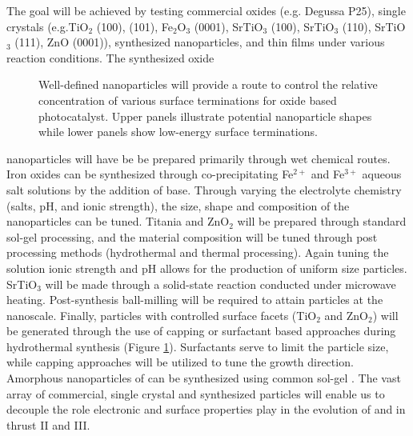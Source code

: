 The goal will be achieved by testing commercial oxides (e.g. Degussa P25), single crystals (e.g.TiO$_{2}$ (100), (101), Fe$_2$O$_3$ (0001), SrTiO$_3$ (100), SrTiO$_3$ (110), SrTiO$_3$ (111), ZnO (0001)), synthesized nanoparticles, and thin films under various reaction conditions. The synthesized oxide \begin{figure}
\centering
\vspace{-12pt}
\caption{Well-defined nanoparticles will provide a route to control the relative concentration of various surface terminations for oxide based photocatalyst. Upper panels illustrate potential nanoparticle shapes while lower panels show low-energy surface terminations.}\label{fig:TiO2_facets}
\vspace{-14pt}
\end{figure}nanoparticles will have be be prepared primarily through wet chemical routes. Iron oxides can be synthesized through co-precipitating Fe$^{2+}$ and Fe$^{3+}$ aqueous salt solutions by the addition of base. Through varying the electrolyte chemistry (salts, pH, and ionic strength), the size, shape and composition of the nanoparticles can be tuned\cite{gupta_2005}. Titania and ZnO$_2$ will be prepared through standard sol-gel processing, and the material composition will be tuned through post processing methods (hydrothermal and thermal processing)\cite{chen_2009}. Again tuning the solution ionic strength and pH allows for the production of uniform size particles. SrTiO$_3$ will be made through a solid-state reaction conducted under microwave heating. Post-synthesis ball-milling will be required to attain particles at the nanoscale\cite{makarova_2010}. Finally, particles with controlled surface facets (TiO$_2$ and ZnO$_2$) will be generated through the use of capping or
surfactant based approaches during hydrothermal synthesis \cite{Dinh2009,Liao2007} (Figure \ref{fig:TiO2_facets}). Surfactants serve to limit the particle size, while capping approaches will be utilized to tune the growth direction. Amorphous nanoparticles of  can be synthesized using common sol-gel  \cite{ReyesCoronado2008}.  The vast array of commercial, single crystal and synthesized particles will enable us to decouple the role electronic and surface properties play in the evolution of \NH\hspace{1mm} and \NO\hspace{1mm} in thrust II and III. 



